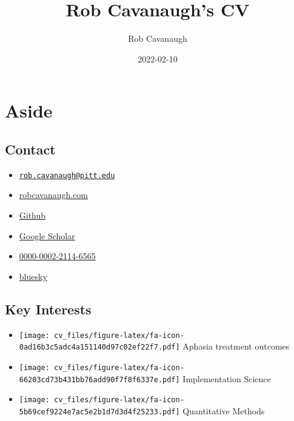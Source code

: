 \documentclass[
]{article}
\title{Rob Cavanaugh's CV}
\author{Rob Cavanaugh}
\date{2022-02-10}
\providecommand{\tightlist}{%
  \setlength{\itemsep}{0pt}\setlength{\parskip}{0pt}}
\begin{document}
\maketitle

\hypertarget{aside}{%
\section{Aside}\label{aside}}

\hypertarget{contact}{%
\subsection{Contact}\label{contact}}

\begin{itemize}
\tightlist
\item

  \href{mailto:rob.cavanaugh@pitt.edu}{\nolinkurl{rob.cavanaugh@pitt.edu}}
\item
  \href{https://robcavanaugh.com}{robcavanaugh.com}
\item
  \href{https://github.com/rbcavanaugh}{Github}
\item

  \href{https://scholar.google.com/citations?user=7pMLCJsAAAAJ\&hl=en}{Google
  Scholar}
\item
  \href{https://orcid.org/0000-0002-2114-6565}{0000-0002-2114-6565}
\item
  \href{https://bluesky.com/Littlejohnsband}{bluesky}
\end{itemize}

\hypertarget{key-interests}{%
\subsection{Key Interests}\label{key-interests}}

\begin{itemize}
\item
  \texttt{[image: cv\_files/figure-latex/fa-icon-0ad16b3c5adc4a151140d97c02ef22f7.pdf]}
  Aphasia treatment outcomes
\item
  \texttt{[image: cv\_files/figure-latex/fa-icon-66203cd73b431bb76add90f7f8f6337e.pdf]}
  Implementation Science
\item
  \texttt{[image: cv\_files/figure-latex/fa-icon-5b69cef9224e7ac5e2b1d7d3d4f25233.pdf]}
  Quantitative Methods
\end{itemize}
\end{document}
